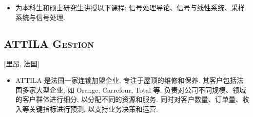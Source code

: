 \documentclass{mycv}
\begin{document}
\begin{positions}
\end{positions}

\begin{itemize}
  \item 为本科生和硕士研究生讲授以下课程: 信号处理导论、信号与线性系统、采样系统与信号处理.
\end{itemize}

\vspace{-0.5em}

\subsection{\large \scshape ATTILA Gestion}[里昂, 法国]

\vspace{0.3em}

\begin{positions}
\end{positions}

\begin{itemize}
  \item ATTILA 是法国一家连锁加盟企业, 专注于屋顶的维修和保养. 其客户包括法国多家大型企业, 如 Orange, Carrefour, Total 等. 负责对公司不同规模、领域的客户群体进行细分, 以分配不同的资源和服务. 同时对客户数量、订单量、收入等关键指标进行预测, 以支持业务决策和运营.
\end{itemize}

\vspace{-0.5em}



\end{document}
